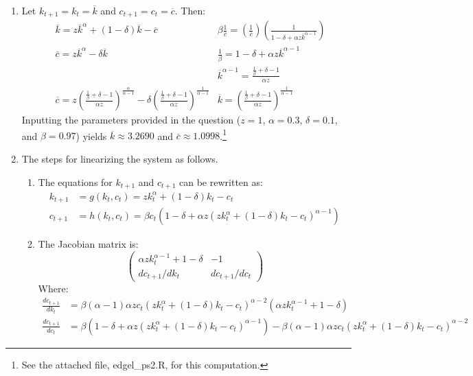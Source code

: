 \documentclass{article}
\begin{document}
\begin{enumerate}
	\item Let $k_{t+1}=k_t=\overline{k}$ and $c_{t+1}=c_t=\overline{c}$. Then:
		\begin{align*}
			&\overline{k}=z\overline{k}^\alpha+(1-\delta)\overline{k} - \overline{c}	
			& \beta \frac{1}{\overline{c}}=\left(\frac{1}{\overline{c}}\right)\left(\frac{1}{1-\delta+\alpha z \overline{k}^{\alpha-1}}\right)				\\
			&\overline{c}=z\overline{k}^\alpha-\delta\overline{k}	
			& \frac{1}{\beta}= 1-\delta+\alpha z \overline{k}^{\alpha-1} 	\\
			& 	& \overline{k}^{\alpha-1} = \frac{\frac{1}{\beta}+\delta-1}{\alpha z}		\\
			& \overline{c}=z
				\left(\frac{\frac{1}{\beta}+\delta-1}{\alpha z}
						\right)^{\frac{\alpha}{\alpha-1}}
				-\delta\left(
							\frac{\frac{1}{\beta}+\delta-1}{\alpha z}
							\right)^{\frac{1}{\alpha-1}} 	
				& \overline{k} = \left(
									\frac{\frac{1}{\beta}+\delta-1}{\alpha z}
									\right)^{\frac{1}{\alpha-1}}	
		\end{align*}
		Inputting the parameters provided in the question ($z=1$, $\alpha=0.3$, $\delta=0.1$, and $\beta=0.97$) yields $\overline{k}\approx3.2690$ and $\overline{c}\approx 1.0998$.\footnote{See the attached file, edgel\_ps2.R, for this computation.}
		
	\item The steps for linearizing the system as follows.
		\begin{enumerate}
			\item The equations for $k_{t+1}$ and $c_{t+1}$ can be rewritten as:
				\begin{align*}
					k_{t+1} &= g(k_t,c_t) = zk_t^\alpha + (1-\delta)k_t-c_t \\
					c_{t+1} &= h(k_t,c_t) = \beta c_t\left(1-\delta+\alpha z(zk_t^\alpha + (1-\delta)k_t-c_t)^{\alpha-1}\right)
				\end{align*}
				
			\item The Jacobian matrix is:
				\[
					\begin{pmatrix}
						\alpha zk_t^{\alpha-1}+1-\delta 	& -1 					\\ 
						dc_{t+1}/dk_t					& dc_{t+1}/dc_t
					\end{pmatrix}
				\]
				Where:
				\begin{align*}
					\frac{dc_{t+1}}{dk_t} &= \beta(\alpha-1)\alpha z c_t(z k_t^\alpha + (1-\delta)k_t - c_t)^{\alpha-2}(\alpha z k_t^{\alpha-1}+1-\delta)	\\
					\frac{dc_{t+1}}{dc_t} &= \beta(1-\delta+\alpha z(zk_t^\alpha+(1-\delta)k_t-c_t)^{\alpha-1})-\beta(\alpha-1)\alpha z c_t(zk_t^\alpha+(1-\delta)k_t-c_t)^{\alpha-2}
				\end{align*}
				

\end{enumerate}
\end{enumerate}
\end{document}
